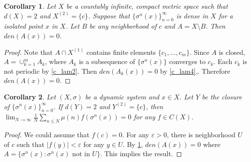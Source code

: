 \documentclass[a4paper,10pt]{amsart}
\newtheorem{corollary}{Corollary}[section]
\begin{document}
\begin{corollary} \label{c_cor1}
   Let $X$ be a countably infinite, compact metric space such that $d(X)=2$
   and $X^{(2)} = \{c\}$. Suppose that $\{ \sigma^{n}(x) \}_{n=0}^{\infty}$ 
   is dense in $X$ for a isolated point $x$ in $X$. Let $B$ be any neighborhood
   of $c$ and $A = X \setminus B$. Then $den(A(x)) = 0$.
\end{corollary}

\begin{proof}
    Note that $A \cap X^{(1)}$ contains finite elements $\{c_1, \ldots, c_m \}$.
    Since $A$ is closed, $A=\cup^{m}_{k=1}A_{k}$, where $A_{k}$ is a 
    subsequence of $\{\sigma^{n}(x)\}$ converges to $c_k$. Each $c_k$ is not
    periodic by \cref{c_lam2}. Then
    $den(A_{k}(x)) = 0$ by \cref{c_lam4},. Therefore $den(A(x)) = 0$.
\end{proof}

\begin{corollary} \label{c_cor2}
    Let $(X, \sigma)$ be a dynamic system and $x \in X$. Let $Y$ be the closure of  
    $\{ \sigma^{n}(x) \}_{n=0}^{\infty}$. If $d(Y) = 2$ and $Y^{(2)} = \{c\}$, 
    then $\lim_{N \rightarrow \infty}
   \frac{1}{N} \sum_{n \leq N}\mu(n)f(\sigma^{n}(x)) = 0$ for any $f \in C(X)$.
\end{corollary}

\begin{proof}
    We could assume that $f(c) = 0$. For any $\varepsilon > 0$, there is 
    neighborhood $U$ of $c$ such that $|f(y)|< \varepsilon$ for any $y \in U$.
    By \cref{c_cor1}, $den(A(x)) = 0$ where $A = \{\sigma^{n}(x) : 
    \sigma^{n}(x) \mbox{ not in } U \}$. This implies the result. 
\end{proof}
\end{document}
